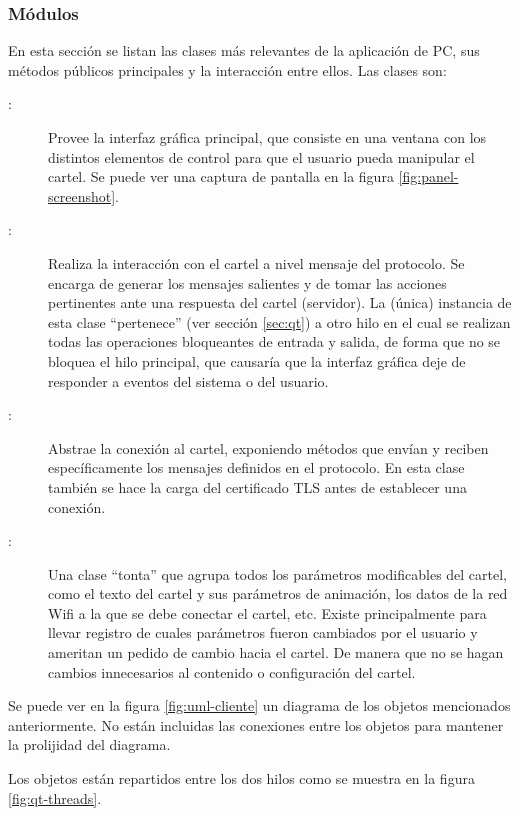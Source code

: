 \subsubsection{Módulos}
En esta sección se listan las clases más relevantes de la aplicación de PC, sus métodos públicos principales y la interacción entre ellos.
Las clases son:
\begin{description}
	\item[:] Provee la interfaz gráfica principal, que consiste en una ventana con los distintos elementos de control para que el usuario pueda manipular el cartel. Se puede ver una captura de pantalla en la figura \ref{fig:panel-screenshot}.
	\item[:] Realiza la interacción con el cartel a nivel mensaje del protocolo. Se encarga de generar los mensajes salientes y de tomar las acciones pertinentes ante una respuesta del cartel (servidor). La (única) instancia de esta clase \enquote{pertenece} (ver sección \ref{sec:qt}) a otro hilo en el cual se realizan todas las operaciones bloqueantes de entrada y salida, de forma que no se bloquea el hilo principal, que causaría que la interfaz gráfica deje de responder a eventos del sistema o del usuario.
	\item[:] Abstrae la conexión al cartel, exponiendo métodos que envían y reciben específicamente los mensajes definidos en el protocolo. En esta clase también se hace la carga del certificado TLS antes de establecer una conexión.
	\item[:] Una clase \enquote{tonta} que agrupa todos los parámetros modificables del cartel, como el texto del cartel y sus parámetros de animación, los datos de la red Wifi a la que se debe conectar el cartel, etc. Existe principalmente para llevar registro de cuales parámetros fueron cambiados por el usuario y ameritan un pedido de cambio hacia el cartel. De manera que no se hagan cambios innecesarios al contenido o configuración del cartel.
\end{description}

Se puede ver en la figura \ref{fig:uml-cliente} un diagrama de los objetos mencionados anteriormente. No están incluidas las conexiones entre los objetos para mantener la prolijidad del diagrama.

Los objetos están repartidos entre los dos hilos como se muestra en la figura \ref{fig:qt-threads}.

